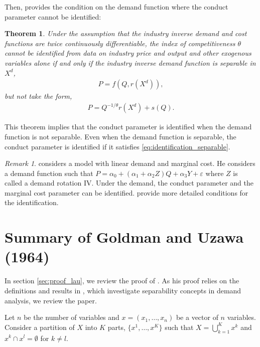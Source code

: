 \documentclass[11pt, a4paper]{article}
\newtheorem{theorem}{Theorem}
\theoremstyle{remark}
\newtheorem{remark}{Remark}
\begin{document}
Then, \citet{lau1982identifying} provides the condition on the demand function where the conduct parameter cannot be identified:
\begin{theorem}\label{theorem_lau}
    Under the assumption that the industry inverse demand and cost functions are twice continuously differentiable, the index of competitiveness $\theta$ cannot be identified from data on industry price and output and other exogenous variables alone if and only if the industry inverse demand function is separable in $X^{d}$, 
    \begin{align}
        P = f(Q, r(X^{d})), \label{eq:demand_separable}
    \end{align}
    but not take the form, 
    \begin{align}
        P = Q^{-1/\theta}r(X^{d}) + s(Q). \label{eq:identification_separable}
    \end{align}
\end{theorem}
This theorem implies that the conduct parameter is identified when the demand function is not separable.
Even when the demand function is separable, the conduct parameter is identified if it satisfies \eqref{eq:identification_separable}.

\begin{remark}
    \citet{bresnahan1982oligopoly} considers a model with linear demand and marginal cost.
    He considers a demand function such that $P = \alpha_0 + (\alpha_1 + \alpha_2 Z) Q + \alpha_3 Y + \varepsilon$ where $Z$ is called a demand rotation IV.
    Under the demand, the conduct parameter and the marginal cost parameter can be identified.
    \citet{matsumura2023resolving} provide more detailed conditions for the identification.
\end{remark}

\section{Summary of Goldman and Uzawa (1964)}

In section \ref{sec:proof_lau}, we review the proof of \citet{lau1982identifying}.
As his proof relies on the definitions and results in \citet{goldmanNote1964}, which investigate separability concepts in demand analysis, we review the paper.

Let $n$ be the number of variables and $x = (x_{1},\ldots, x_{n})$ be a vector of $n$ variables.
Consider a partition of $X$ into $K$ parts, $\{x^1, \ldots, x^K\}$ such that $X = \bigcup_{k=1}^K x^k$ and $x^k \cap x^l = \emptyset$ for $k\ne l$.
\end{document}
